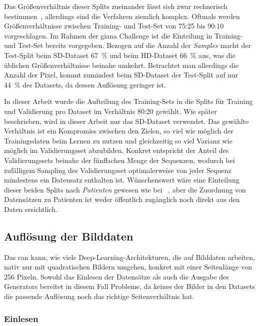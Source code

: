 Das Größenverhältnis dieser Splits zueinander lässt sich zwar rechnerisch bestimmen~\cite{Guyon.1998,Guyon.1997}, allerdings sind die Verfahren ziemlich komplex.
Oftmals werden Größenverhältnisse zwischen Training- und Test-Set von 75:25 bis 90:10 vorgeschlagen.
Im Rahmen der \gls{giana} Challenge ist die Einteilung in Training- und Test-Set bereits vorgegeben.
Bezogen auf die Anzahl der \emph{Samples} macht der Test-Split beim SD-Dataset 67~\% und beim HD-Dataset 66~\% aus, was die üblichen Größenverhältnisse beinahe umkehrt.
Betrachtet man allerdings die Anzahl der Pixel, kommt zumindest beim SD-Dataset der Test-Split auf nur 44~\% des Datasets, da dessen Auflösung geringer ist.

In dieser Arbeit wurde die Aufteilung des Training-Sets in die Splits für Training und Validierung pro Dataset im Verhältnis 80:20 gewählt.
Wie später beschrieben, wird in dieser Arbeit nur das SD-Dataset verwendet.
Das gewählte Verhältnis ist ein Kompromiss zwischen den Zielen, so viel wie möglich der Trainingsdaten beim Lernen zu nutzen und gleichzeitig so viel Varianz wie möglich im Validierungsset abzubilden.
Konkret entspricht der Anteil des Validierungssets beinahe der fünffachen Menge der Sequenzen, wodurch bei zufälligem Sampling des Validierungsset optimalerweise von jeder Sequenz mindestens ein Datensatz enthalten ist.
Wünschenswert wäre eine Einteilung dieser beiden Splits nach \emph{Patienten} gewesen wie bei \citeauthor{Vazquez.2017}~\cite{Vazquez.2017}, aber die Zuordnung von Datensätzen zu Patienten ist weder öffentlich zugänglich noch direkt aus den Daten ersichtlich.



\subsection{Auflösung der Bilddaten}

Das \gls{can} kann, wie viele Deep-Learning-Architekturen, die auf Bilddaten arbeiten, nativ nur mit quadratischen Bildern umgehen, konkret mit einer Seitenlänge von 256 Pixeln.
Sowohl das Einlesen der Datensätze als auch die Ausgabe des Generators bereitet in diesem Fall Probleme, da keines der Bilder in den Datasets die passende Auflösung noch das richtige Seitenverhältnis hat.



\subsubsection{Einlesen}

